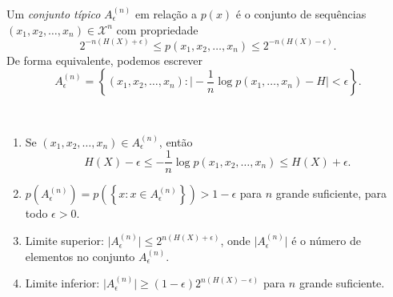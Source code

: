 \begin{definition}\label{def:conjtipico}
  Um \emph{conjunto típico} $A_\epsilon^{(n)}$ em relação a $p(x)$ é o conjunto de sequências
  $(x_1,x_2,\ldots,x_n) \in \mathcal{X}^n$ com propriedade
  \begin{equation}\label{eq:probseqtipicas}
  2^{-n(H(X)+\epsilon)} \leq p(x_1, x_2, \ldots, x_n) \leq 2^{-n(H(X)-\epsilon)} .
  \end{equation}
  De forma equivalente, podemos escrever
  \begin{equation}
  A_\epsilon^{(n)} = \left\{ (x_1, x_2, \ldots, x_n) : \vert - \frac{1}{n} \log p(x_1, \ldots, x_n) - H \vert < \epsilon \right\} .
  \end{equation}
\end{definition}



\begin{theorem}\label{thm:propconjtip}
\ \\ 
\begin{enumerate}
\item\label{prop1conjtip} Se $(x_1, x_2, \ldots, x_n) \in A_\epsilon^{(n)}$, então
      \begin{equation}
      H(X) - \epsilon \leq - \frac{1}{n} \log p(x_1, x_2, \ldots, x_n) \leq H(X) + \epsilon .
      \end{equation}
\item\label{prop2conjtip} $p(A_\epsilon^{(n)}) = p\left( \left\{ x: x \in A_\epsilon^{(n)} \right\} \right) > 1 - \epsilon$ para $n$ grande suficiente, para todo $\epsilon > 0$.
\item\label{prop3conjtip} Limite superior: $\vert A_\epsilon^{(n)} \vert \leq 2^{n(H(X)+\epsilon)}$, onde $\vert A_\epsilon^{(n)} \vert$ é o número de elementos no conjunto $A_\epsilon^{(n)}$.
\item\label{prop4conjtip} Limite inferior: $\vert A_\epsilon^{(n)} \vert \geq (1-\epsilon) 2^{n(H(X) - \epsilon)}$ para $n$ grande suficiente.
\end{enumerate}
\end{theorem}

